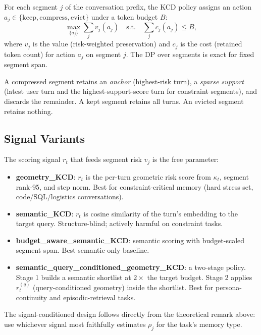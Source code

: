 \documentclass[conference]{IEEEtran}
\begin{document}
For each segment $j$ of the conversation prefix, the KCD policy assigns an
action $a_j \in \{\mathrm{keep}, \mathrm{compress}, \mathrm{evict}\}$ under a
token budget $B$:
\begin{equation}
\max_{\{a_j\}} \sum_j v_j(a_j)
\quad
\text{s.t.}
\quad
\sum_j c_j(a_j) \leq B,
\end{equation}
where $v_j$ is the value (risk-weighted preservation) and $c_j$ is the cost
(retained token count) for action $a_j$ on segment $j$. The DP over segments
is exact for fixed segment span.

A compressed segment retains an \emph{anchor} (highest-risk turn), a \emph{sparse
support} (latest user turn and the highest-support-score turn for constraint
segments), and discards the remainder. A kept segment retains all turns. An
evicted segment retains nothing.

\subsection{Signal Variants}

The scoring signal $r_t$ that feeds segment risk $v_j$ is the free parameter:

\begin{itemize}[leftmargin=1.4em]
\item \textbf{geometry\_KCD}: $r_t$ is the per-turn geometric risk score from
  $\kappa_t$, segment rank-95, and step norm. Best for constraint-critical
  memory (hard stress set, code/SQL/logistics conversations).
\item \textbf{semantic\_KCD}: $r_t$ is cosine similarity of the turn's embedding
  to the target query. Structure-blind; actively harmful on constraint tasks.
\item \textbf{budget\_aware\_semantic\_KCD}: semantic scoring with budget-scaled
  segment span. Best semantic-only baseline.
\item \textbf{semantic\_query\_conditioned\_geometry\_KCD}: a two-stage policy.
  Stage 1 builds a semantic shortlist at $2\times$ the target budget. Stage 2
  applies $r_t^{(q)}$ (query-conditioned geometry) inside the shortlist. Best
  for persona-continuity and episodic-retrieval tasks.
\end{itemize}

The signal-conditioned design follows directly from the theoretical remark
above: use whichever signal most faithfully estimates $\rho_j$ for the task's
memory type.

\end{document}
